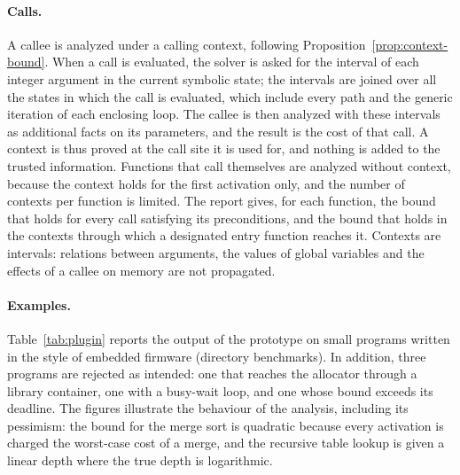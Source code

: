 \documentclass[oneside,english]{amsart}
\numberwithin{equation}{section}
\numberwithin{figure}{section}
\theoremstyle{plain}
\theoremstyle{definition}
\theoremstyle{plain}
\theoremstyle{remark}
\theoremstyle{plain}
\theoremstyle{definition}
\theoremstyle{plain}
\theoremstyle{remark}
\newcommand{\lean}[1]{{\ttfamily\small #1}}
\begin{document}
\paragraph{Calls.}
A callee is analyzed under a calling context, following Proposition~\ref{prop:context-bound}. When a call is evaluated, the solver is asked for the interval of each integer argument in the current symbolic state; the intervals are joined over all the states in which the call is evaluated, which include every path and the generic iteration of each enclosing loop. The callee is then analyzed with these intervals as additional facts on its parameters, and the result is the cost of that call. A context is thus proved at the call site it is used for, and nothing is added to the trusted information. Functions that call themselves are analyzed without context, because the context holds for the first activation only, and the number of contexts per function is limited. The report gives, for each function, the bound that holds for every call satisfying its preconditions, and the bound that holds in the contexts through which a designated entry function reaches it. Contexts are intervals: relations between arguments, the values of global variables and the effects of a callee on memory are not propagated.

\paragraph{Examples.}
Table~\ref{tab:plugin} reports the output of the prototype on small programs written in the style of embedded firmware (directory \lean{benchmarks}). In addition, three programs are rejected as intended: one that reaches the allocator through a library container, one with a busy-wait loop, and one whose bound exceeds its deadline. The figures illustrate the behaviour of the analysis, including its pessimism: the bound for the merge sort is quadratic because every activation is charged the worst-case cost of a merge, and the recursive table lookup is given a linear depth where the true depth is logarithmic.
\end{document}
